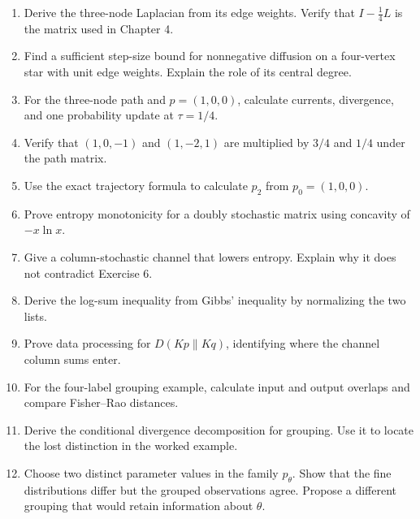 \documentclass[11pt,oneside,openany]{book}
\theoremstyle{definition}
\theoremstyle{remark}
\newenvironment{exercises}{\begin{enumerate}[label=\thechapter.\arabic*,ref=\thechapter.\arabic*,leftmargin=2.8em,itemsep=6pt]}{\end{enumerate}}
\numberwithin{equation}{chapter}
\begin{document}
\begin{exercises}

\item 

Derive the three-node Laplacian from its edge weights. Verify that \(I-\tfrac14L\) is the matrix used in Chapter 4.

\item 

Find a sufficient step-size bound for nonnegative diffusion on a four-vertex star with unit edge weights. Explain the role of its central degree.

\item 

For the three-node path and \(p=(1,0,0)\), calculate currents, divergence, and one probability update at \(\tau=1/4\).

\item 

Verify that \((1,0,-1)\) and \((1,-2,1)\) are multiplied by \(3/4\) and \(1/4\) under the path matrix.

\item 

Use the exact trajectory formula to calculate \(p_2\) from \(p_0=(1,0,0)\).

\item 

Prove entropy monotonicity for a doubly stochastic matrix using concavity of \(-x\ln x\).

\item 

Give a column-stochastic channel that lowers entropy. Explain why it does not contradict Exercise 6.

\item 

Derive the log-sum inequality from Gibbs' inequality by normalizing the two lists.

\item 

Prove data processing for \(D(Kp\|Kq)\), identifying where the channel column sums enter.

\item 

For the four-label grouping example, calculate input and output overlaps and compare Fisher--Rao distances.

\item 

Derive the conditional divergence decomposition for grouping. Use it to locate the lost distinction in the worked example.

\item 

Choose two distinct parameter values in the family \(p_\theta\). Show that the fine distributions differ but the grouped observations agree. Propose a different grouping that would retain information about \(\theta\).

\end{exercises}
\end{document}
